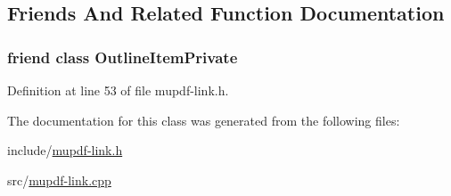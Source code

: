 \subsection{Friends And Related Function Documentation}
\hypertarget{class_mu_p_d_f_1_1_link_goto_ab008ed670017e41b6e6bba8707c775d2}{
\subsubsection[{Outline\-Item\-Private}]{\setlength{\rightskip}{0pt plus 5cm}friend class Outline\-Item\-Private\hspace{0.3cm}{\ttfamily [friend]}}}\label{class_mu_p_d_f_1_1_link_goto_ab008ed670017e41b6e6bba8707c775d2}


Definition at line 53 of file mupdf-\/link.\-h.



The documentation for this class was generated from the following files\-:\begin{DoxyCompactItemize}
\item 
include/\hyperlink{mupdf-link_8h}{mupdf-\/link.\-h}\item 
src/\hyperlink{mupdf-link_8cpp}{mupdf-\/link.\-cpp}\end{DoxyCompactItemize}
